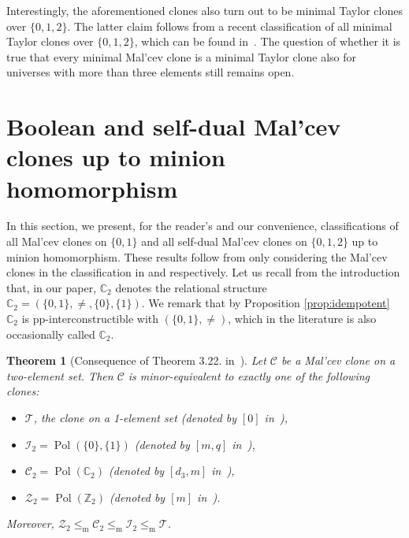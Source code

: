 \documentclass[12pt]{amsart}
\newtheorem{theorem}{Theorem}[section]
\theoremstyle{definition}
\theoremstyle{definition}
\newcommand{\struct}[1]{\mathbb{#1}}
\DeclareMathOperator{\Pol}{Pol}
\newcommand{\isaminorof}{\leq_{\mathrm{m}}}
\begin{document}
Interestingly, the aforementioned clones also turn out to be minimal Taylor clones over $\{0,1,2\}$. The latter claim follows from a recent classification of all minimal Taylor clones over $\{0,1,2\}$, which can be found in~\cite{Zeb,MinTaylorOver3}. The question of whether it is true that every minimal Mal'cev clone is a minimal Taylor clone also for universes with more than three elements still remains open.


\section{Boolean and self-dual Mal'cev clones up to minion homomorphism} \label{sec:selfdual}

In this section, we present, for the reader's and our convenience, classifications of all Mal'cev clones on $\{0,1\}$ and all self-dual Mal'cev clones on $\{0,1,2\}$ up to minion homomorphism. These results follow from only considering the Mal'cev clones in the classification in \cite{albert} and \cite{BodirskyVucajZhuk} respectively. Let us recall from the introduction that, in our paper, $\struct{C}_2$ denotes the relational structure $\struct{C}_2 = (\{0,1\},\neq,\{0\}, \{1\})$. We remark that by Proposition \ref{prop:idempotent} $\struct{C}_2$ is pp-interconstructible with $(\{0,1\},\neq)$, which in the literature is also occasionally called $\struct{C}_2$.

\begin{theorem}[Consequence of Theorem 3.22. in~\cite{albert}] \label{thm:2element}
Let $\mathcal C$ be a Mal'cev clone on a two-element set. Then $\mathcal C$ is minor-equivalent to exactly one of the following clones:
\begin{itemize}
\item $\mathcal T$, the clone on a 1-element set  \hfill (denoted by $[0]$ in~\cite{albert}),
\item $\mathcal I_2 = \Pol(\{0\},\{1\})$  \hfill (denoted by $[m,q]$ in~\cite{albert}),
\item $\mathcal C_2 = \Pol(\mathbb C_2)$  \hfill (denoted by $[d_3,m]$ in~\cite{albert}),
\item $\mathcal Z_2 = \Pol(\mathbb Z_2)$  \hfill (denoted by $[m]$ in~\cite{albert}).
\end{itemize}
Moreover, $\mathcal Z_2 \isaminorof \mathcal C_2 \isaminorof \mathcal I_2 \isaminorof \mathcal T$.
\end{theorem}
\end{document}

